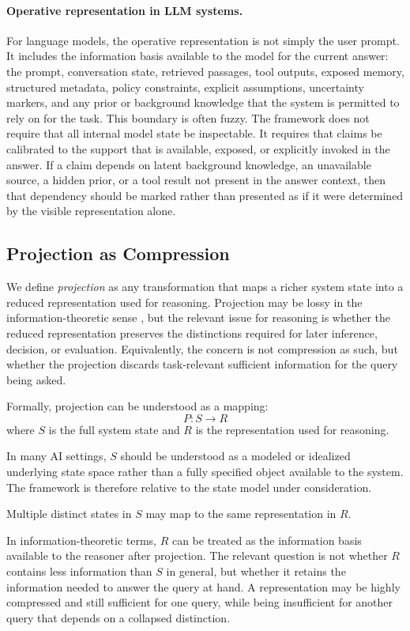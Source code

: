 \documentclass[11pt]{article}
\begin{document}
\paragraph{Operative representation in LLM systems.}
For language models, the operative representation is not simply the user prompt. It includes the information basis available to the model for the current answer: the prompt, conversation state, retrieved passages, tool outputs, exposed memory, structured metadata, policy constraints, explicit assumptions, uncertainty markers, and any prior or background knowledge that the system is permitted to rely on for the task. This boundary is often fuzzy. The framework does not require that all internal model state be inspectable. It requires that claims be calibrated to the support that is available, exposed, or explicitly invoked in the answer. If a claim depends on latent background knowledge, an unavailable source, a hidden prior, or a tool result not present in the answer context, then that dependency should be marked rather than presented as if it were determined by the visible representation alone.

\subsection{Projection as Compression}

We define \emph{projection} as any transformation that maps a richer system state into a reduced representation used for reasoning. Projection may be lossy in the information-theoretic sense \cite{Shannon1948}, but the relevant issue for reasoning is whether the reduced representation preserves the distinctions required for later inference, decision, or evaluation. Equivalently, the concern is not compression as such, but whether the projection discards task-relevant sufficient information for the query being asked.

Formally, projection can be understood as a mapping:
\[
P: S \rightarrow R
\]
where $S$ is the full system state and $R$ is the representation used for reasoning.

In many AI settings, \(S\) should be understood as a modeled or idealized underlying state space rather than a fully specified object available to the system. The framework is therefore relative to the state model under consideration.

Multiple distinct states in $S$ may map to the same representation in $R$.

In information-theoretic terms, $R$ can be treated as the information basis available to the reasoner after projection. The relevant question is not whether $R$ contains less information than $S$ in general, but whether it retains the information needed to answer the query at hand. A representation may be highly compressed and still sufficient for one query, while being insufficient for another query that depends on a collapsed distinction.
\end{document}
